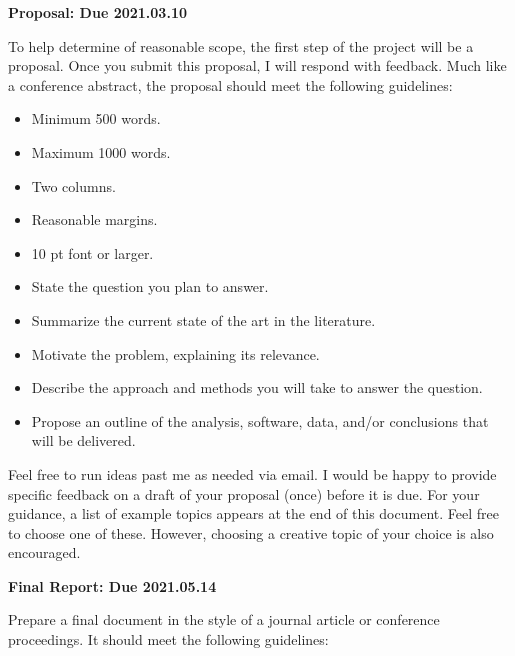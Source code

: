 \documentclass[12pts, answers]{exam}
\newcommand{\duedate}{2021.05.14}
\begin{document}
\begin{questions}
\addpoints
\question \textbf{Proposal: Due 2021.03.10}

To help determine of reasonable scope, the first step of the project will be a
proposal. Once you submit this proposal, I will respond with feedback. Much
like a conference abstract, the proposal should meet the following guidelines:

\begin{itemize}
\item Minimum 500 words.
\item Maximum 1000 words.
\item Two columns.
\item Reasonable margins.
\item 10 pt font or larger.
\item State the question you plan to answer.
\item Summarize the current state of the art in the literature.
\item Motivate the problem, explaining its relevance.
\item Describe the approach and methods you will take to answer the question.
\item Propose an outline of the analysis, software, data, and/or conclusions that will be delivered.
\end{itemize}

Feel free to run ideas past me as needed via email. I would be happy to provide 
        specific feedback on a draft of your proposal (once) before it is due. 
        For your guidance, a list of example topics appears at the end of this 
        document. Feel free to choose one of these.  However, choosing a 
        creative topic of your choice is also encouraged.


\question \textbf{Final Report: Due \duedate}

Prepare a final document in the style of a journal article or conference
proceedings. It should meet the following guidelines:


\end{questions}
\end{document}
